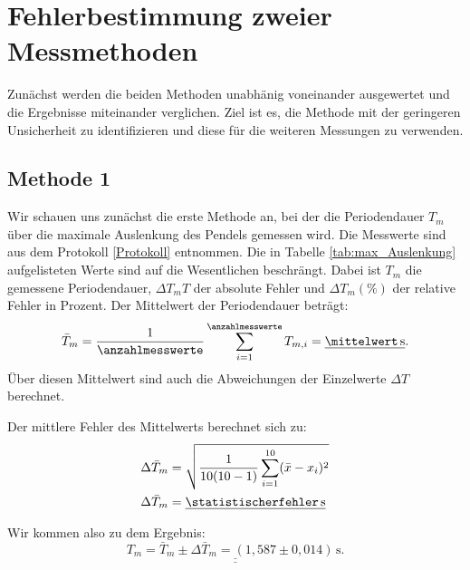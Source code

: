 \twocolumn

\section{Fehlerbestimmung zweier Messmethoden}
Zunächst werden die beiden Methoden unabhänig voneinander ausgewertet und die Ergebnisse miteinander verglichen. Ziel ist es, die Methode mit der geringeren Unsicherheit zu identifizieren und diese für die weiteren Messungen zu verwenden.
\subsection*{Methode 1}
Wir schauen uns zunächst die erste Methode an, bei der die Periodendauer $T_{m}$ über die maximale Auslenkung des Pendels gemessen wird. Die Messwerte sind aus dem Protokoll \ref{Protokoll} entnommen. Die in Tabelle \ref{tab:max_Auslenkung} aufgelisteten Werte sind auf die Wesentlichen beschrängt.
Dabei ist $T_{m}$ die gemessene Periodendauer, $\Delta T_{m}T$ der absolute Fehler und $\Delta T_{m} (\%)$ der relative Fehler in Prozent.
\messwertetabelle
\vspace{2pt}
Der Mittelwert der Periodendauer beträgt:
\begin{equation}
    \bar{T}_{m} = \frac{1}{\anzahlmesswerte}\sum_{i=1}^{\anzahlmesswerte} T_{m,i} = \underline{\mittelwert\,\mathrm{s}}.
\end{equation}
Über diesen Mittelwert sind auch die Abweichungen der Einzelwerte $\Delta T$ berechnet.

Der mittlere Fehler des Mittelwerts berechnet sich zu:
\begin{align}
    \Delta \bar{T}_{m} &= \sqrt{\frac{1}{10(10-1)} \sum_{i=1}^{10} (\bar{x}-x_i)^2}  \\
    \Delta \bar{T}_{m} &= \underline{\statistischerfehler\,\mathrm{s}}
\end{align}

Wir kommen also zu dem Ergebnis:
\begin{equation}
    \underline{\underline{T_{m} = \bar{T}_{m} \pm \Delta \bar{T}_{m} = (1,587 \pm 0,014)\,\mathrm{s}.}}
\end{equation}

